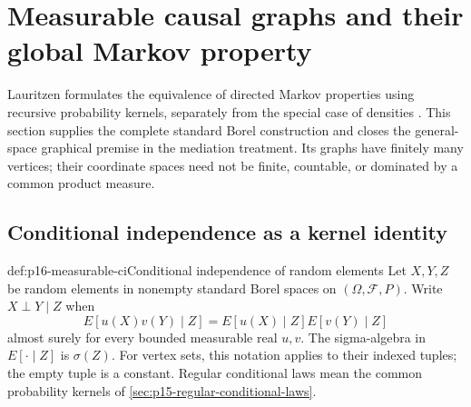 \section{Measurable causal graphs and their global Markov property}
\label{sec:p16-measurable-causal-graphs}

Lauritzen formulates the equivalence of directed Markov properties using
recursive probability kernels, separately from the special case of
densities \cite[Theorems~1.28, 2.44 and 2.49; Propositions~2.46--2.48,
pp.~19--20, 65--68]{Lauritzen2019GraphicalLectures2020}.
This section supplies the complete standard Borel construction and closes
the general-space graphical premise in the mediation treatment. Its graphs
have finitely many vertices; their coordinate spaces need not be finite,
countable, or dominated by a common product measure.

\subsection{Conditional independence as a kernel identity}

\begin{hbdefinition}{def:p16-measurable-ci}{Conditional independence of random elements}
Let \(X,Y,Z\) be random elements in nonempty standard Borel spaces on
\((\Omega,\mathcal F,P)\). Write \(X\perp Y\mid Z\) when
\[
 E[u(X)v(Y)\mid Z]=E[u(X)\mid Z]E[v(Y)\mid Z]
\]
almost surely for every bounded measurable real \(u,v\).
The sigma-algebra in \(E[\cdot\mid Z]\) is \(\sigma(Z)\).
For vertex sets, this notation applies to their indexed tuples; the empty
tuple is a constant. Regular conditional laws mean the common probability
kernels of \cref{sec:p15-regular-conditional-laws}.
\end{hbdefinition}

